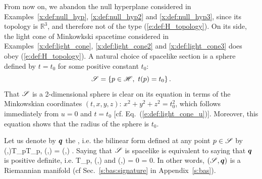 \begin{example} \label{x:def:light_cone4}
From now on, we abandon the null hyperplane considered in Examples~\ref{x:def:null_hyp},
\ref{x:def:null_hyp2} and \ref{x:def:null_hyp3}, since its topology is $\mathbb{R}^3$,
and therefore not of the type (\ref{e:def:H_topology}).
On its side, the light cone of Minkowkski spacetime considered in Examples~\ref{x:def:light_cone},
\ref{x:def:light_cone2} and \ref{x:def:light_cone3} does obey (\ref{e:def:H_topology}).
A natural choice of spacelike
section is a sphere defined by $t=t_0$ for some positive constant $t_0$:
\[
    \mathscr{S} = \left\{ p \in \mathscr{H},\  t(p) = t_0 \right\} .
\]
That $\mathscr{S}$ is a 2-dimensional sphere is clear on its equation in terms
of the Minkowskian coordinates $(t,x,y,z)$:
$x^2+y^2+z^2 = t_0^2$, which follows immediately from $u=0$ and $t = t_0$
[cf. Eq.~(\ref{e:def:light_cone_u})]. Moreover, this equation shows that the
radius of the sphere is $t_0$.
\end{example}

Let us denote by $\bm{q}$ the
,
i.e. the bilinear form defined at any point $p\in\mathscr{S}$ by
\be \label{e:def:def_q_S}
    \forall (,)\in T_p\Sp\times T_p\Sp, \quad
     (,) = (,) .
\ee
Saying that $\mathscr{S}$ is spacelike is equivalent to saying that $\bm{q}$ is
positive definite, i.e.
\be
    \forall {}\in T_p\Sp,\quad
    (,)  \quad \mbox{and} \quad
    (,) = 0 \iff {} = 0.
\ee
In other words, $(\mathscr{S}, \bm{q})$ is a Riemannian manifold (cf Sec.~\ref{s:bas:signature} in Appendix~\ref{s:bas}).

